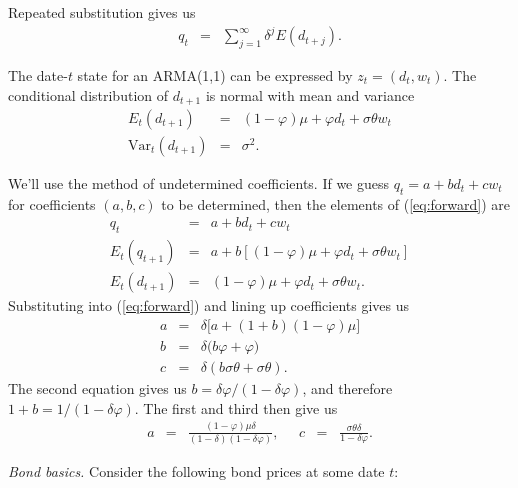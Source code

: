 \documentclass[11pt]{exam}
\begin{document}
\begin{questions}
\begin{solution}
\begin{parts}
\item Repeated substitution gives us
\begin{eqnarray*}
    q_t &=& \sum_{j=1}^\infty \delta^j E(d_{t+j}) .
\end{eqnarray*}
\item The date-$t$ state for an ARMA(1,1) can be expressed by $z_t = (d_t, w_t)$.
The conditional distribution of $d_{t+1}$ is normal with mean and variance
\begin{eqnarray*}
    E_t (d_{t+1}) &=& (1-\varphi) \mu + \varphi d_t + \sigma \theta w_t \\
    \mbox{Var}_t (d_{t+1}) &=& \sigma^2 .
\end{eqnarray*}
\item We'll use the method of undetermined coefficients.
If we guess $q_t = a + b d_t + c w_t $ for coefficients $(a,b,c)$ to be determined,
then the elements of (\ref{eq:forward}) are
\begin{eqnarray*}
    q_t &=& a + b d_t + c w_t \\
    E_t (q_{t+1}) &=& a + b [(1-\varphi) \mu + \varphi d_t + \sigma \theta w_t ] \\
    E_t (d_{t+1}) &=& (1-\varphi) \mu + \varphi d_t + \sigma \theta w_t .
\end{eqnarray*}
Substituting into (\ref{eq:forward}) and lining up coefficients gives us
\begin{eqnarray*}
    a &=& \delta \big[ a + (1+b)(1-\varphi) \mu \big] \\
    b &=& \delta \big( b \varphi + \varphi \big) \\
    c &=& \delta (b \sigma \theta + \sigma \theta) .
\end{eqnarray*}
The second equation gives us $b= \delta\varphi / (1-\delta\varphi) $,
and therefore $1+b = 1/(1-\delta\varphi)$.
The first and third then give us
\begin{eqnarray*}
    a &=& \frac{(1-\varphi)\mu\delta}{(1-\delta)(1-\delta\varphi)} ,
    \;\;\;\;\; c \;\;=\;\; \frac{\sigma\theta\delta}{1-\delta\varphi} .
\end{eqnarray*}

\end{parts}
\end{solution}


\item {\it Bond basics.\/}
Consider the following bond prices at some date $t$:


\end{questions}
\end{document}
